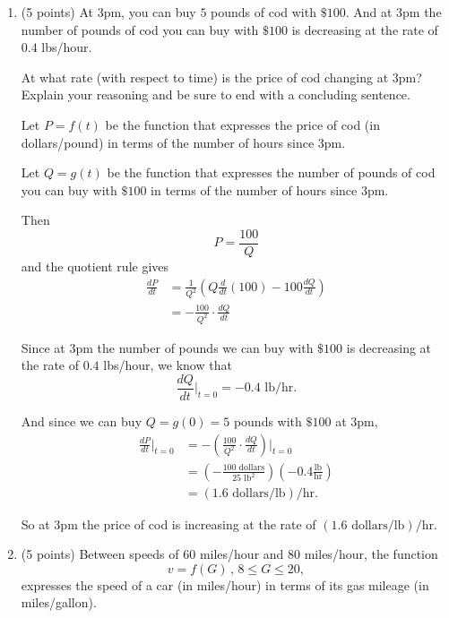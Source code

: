 \documentclass{ximera}
\begin{document}
\begin{enumerate}
\begin{explanation}
\begin{enumerate}
\end{enumerate}
\end{explanation}

\item (5 points) At 3pm, you can buy $5$ pounds of cod with $\$100$. And at 3pm the number of pounds of cod you can buy with $\$100$ is decreasing at the rate of $0.4$ lbs/hour. 

At what rate (with respect to time) is the price of cod changing at 3pm? Explain your reasoning and be sure to end with a concluding sentence.

\begin{explanation}
Let $P=f(t)$ be the function that expresses the price of cod (in dollars/pound) in terms of the number of hours since 3pm.

Let $Q=g(t)$ be the function that expresses the number of pounds of cod you can buy with  $\$100$ in terms of the number of hours since 3pm.

Then 
\[
     P = \frac{100}{Q}
\]
and the quotient rule gives
\begin{align*}
  \frac{dP}{dt}  &= \frac{1}{Q^2}\left( Q \frac{d}{dt}\left( 100 \right) - 100\frac{dQ}{dt} \right)   \\
                       &= - \frac{100}{Q^2} \cdot \frac{dQ}{dt}
\end{align*}

Since at 3pm the number of pounds we can buy with $\$100$ is decreasing at the rate of $0.4$ lbs/hour, we know that
\[
     \frac{dQ}{dt}\Big|_{t=0} = -0.4 \text{ lb}/\text{hr} .
\]

And since we can buy $Q=g(0)=5$ pounds with $\$100$ at 3pm, 
\begin{align*}
  \frac{dP}{dt}\Big|_{t=0}     &=  -\left( \frac{100}{Q^2} \cdot \frac{dQ}{dt} \right)\Big|_{t=0} \\
                                           &= \left(- \frac{100\text{ dollars}}{25\text{ lb}^2}\right) \left( -0.4 \frac{\text{lb}}{\text{hr}} \right) \\
                                          &= (1.6 \text{ dollars} /\text{lb})/\text{hr}.
\end{align*}

So at 3pm the price of cod is increasing at the rate of $(1.6 \text{ dollars} /\text{lb})/\text{hr}$.

\end{explanation}



\item (5 points) Between speeds of $60$ miles/hour and $80$ miles/hour, the function
\[
   v = f(G) \, , \, 8\leq G \leq 20 ,
\]
expresses the speed of a car (in miles/hour) in terms of its gas mileage (in miles/gallon).


\end{enumerate}
\end{document}
